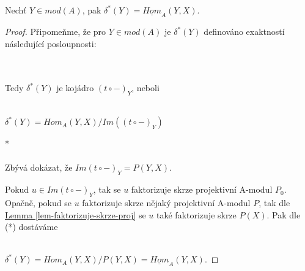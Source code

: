      \begin{lem}\label{lem-delta-as-hom}
        Nechť $Y\in mod(A)$, pak $\delta^*(Y)=\underline{Hom}_A(Y,X)$.
      \end{lem}
      \begin{proof}
        Připomeňme, že pro $Y\in mod(A)$ je $\delta^*(Y)$ definováno exaktností 
        následující posloupnosti: \\
        \centerline{}\\\\      
        Tedy $\delta^*(Y)$ je kojádro $(t\circ-)_Y$, neboli \\\\
        \centerline{$\delta^*(Y)=Hom_A(Y,X)/Im((t\circ-)_Y)$}* \\\\
        Zbývá dokázat, že $Im(t\circ-)_Y=P(Y,X)$.
        
        Pokud $u\in Im(t\circ-)_Y$, tak se $u$ faktorizuje skrze projektivní 
        A-modul $P_0$. Opačně, pokud se $u$ faktorizuje skrze nějaký projektivní 
        A-modul $P$, tak dle \hyperref[lem-faktorizuje-skrze-proj]{Lemma \ref*{lem-faktorizuje-skrze-proj}}
        se $u$ také faktorizuje skrze
        $P(X)$. Pak dle (*) dostáváme \\\\
        \centerline{$\delta^*(Y)=Hom_A(Y,X)/P(Y,X)=\underline{Hom}_A(Y,X)$.}
      \end{proof}
      
